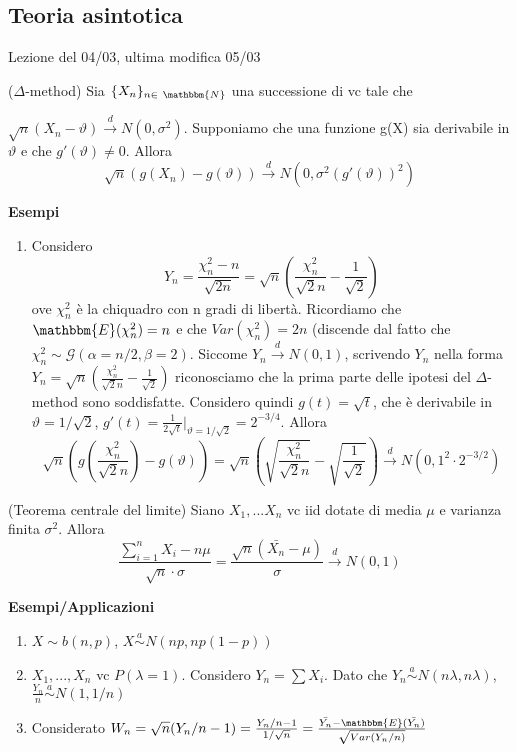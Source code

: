 \subsection{Teoria asintotica}
Lezione del 04/03, ultima modifica 05/03

\begin{teo}
\noindent
($\Delta$-method) Sia $\{X_n\}_{n \in\ \mathbbm{N}}$ una successione di vc
tale che 

\noindent $\sqrt{n}(X_n-\vartheta)\stackrel{d}{\rightarrow}N(0,\sigma^2)$. 
Supponiamo che una funzione g(X) sia derivabile in $\vartheta$ e che $g'(\vartheta)\neq0$. Allora $$\sqrt{n}(g(X_n)-g(\vartheta))\stackrel{d}{\rightarrow}N(0,\sigma^2(g'(\vartheta))^2)$$
\end{teo}

\textbf{Esempi}
\begin{enumerate}
\item Considero $$Y_n=\frac{\chi^2_n-n}{\sqrt{2n}}=\sqrt{n}\left(\frac{\chi^2_n}{\sqrt{2}n}-\frac{1}{\sqrt{2}}\right)$$ ove $\chi^2_n$ è la chiquadro con n gradi di libertà. 
Ricordiamo che $\mathbbm{E}(\chi^2_n)=n$ e che $Var(\chi^2_n)=2n$ (discende dal fatto che $\chi^2_n \sim \mathcal{G}(\alpha=n/2,\beta=2)$. 
Siccome $Y_n \stackrel{d}{\rightarrow} N(0,1)$, scrivendo $Y_n$ nella forma $Y_n=\sqrt{n}\left(\frac{\chi^2_n}{\sqrt{2}n}-\frac{1}{\sqrt{2}}\right)$ riconosciamo che la prima parte delle ipotesi del $\Delta$-method sono soddisfatte.
Considero quindi $g(t)=\sqrt{t}$, che è derivabile in $\vartheta=1/\sqrt{2}$, $g'(t)=\frac{1}{2\sqrt{t}}|_{\vartheta=1/\sqrt{2}}=2^{-3/4}$.
Allora $$\sqrt{n}(g\left(\frac{\chi^2_n}{\sqrt{2}n}\right)-g(\vartheta))=
\sqrt{n}\left(\sqrt{\frac{\chi^2_n}{\sqrt{2}n}}-\sqrt{\frac{1}{\sqrt{2}}}\right)
\stackrel{d}{\rightarrow}N(0,1^2\cdot 2^{-3/2})$$
\end{enumerate}

\begin{teo}
(Teorema centrale del limite) Siano $X_1,...X_n$ vc iid dotate di media $\mu$ e varianza finita $\sigma^2$. Allora 
$$\frac{\sum_{i=1}^n X_i - n\mu}{\sqrt{n}\cdot \sigma} = \frac{\sqrt{n}(\bar{X_n}-\mu)}{\sigma}\stackrel{d}{\rightarrow}N(0,1) $$
\end{teo}

\textbf{Esempi/Applicazioni}
\begin{enumerate}
\item $X \sim b(n,p)$, $X \stackrel{a}{\sim}N(np,np(1-p))$
\item $X_1,...,X_n$ vc 
$P(\lambda =1)$. 
Considero $Y_n=\sum X_i$.
Dato che $Y_n \stackrel{a}
{\sim} N(n\lambda ,n \lambda )$,
 $\frac{Y_n}{n} \stackrel{a}
 {\sim} N(1,1/n)$
\item Considerato $W_n=\sqrt{n}(Y_n/n-1)=\frac{Y_n/n-1}
{1/\sqrt{n}}=\frac{\bar{Y_n} - \mathbbm{E}(\bar{Y_n})}
{\sqrt{Var(Y_n/n)}}$
\end{enumerate}

